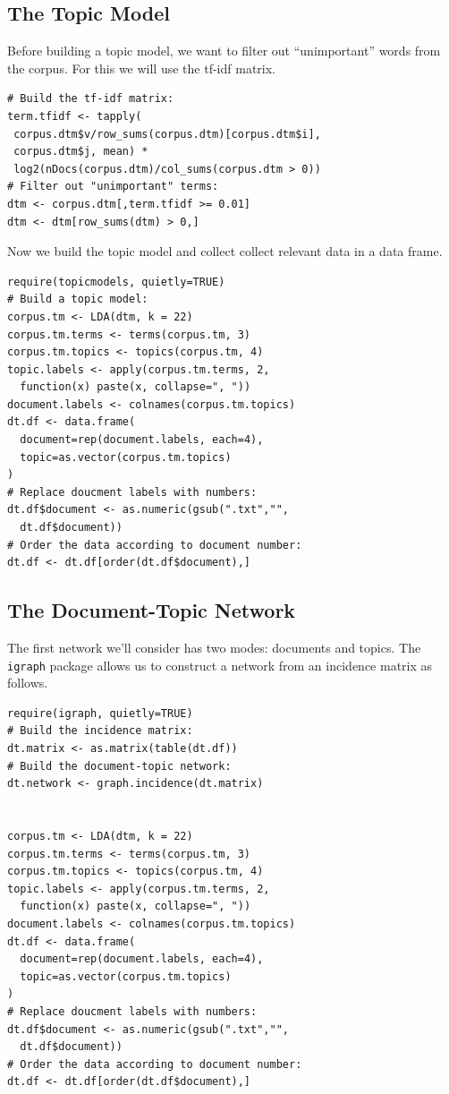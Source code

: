 \documentclass[%
	final,
	notitlepage,
	narroweqnarray,
	inline,
	]{ieee}
\begin{document}
\subsection{The Topic Model}

\PARstart Before building a topic model, we want to filter out ``unimportant'' words from
the corpus. For this we will use the tf-idf matrix.

\begin{verbatim}
# Build the tf-idf matrix:
term.tfidf <- tapply(
 corpus.dtm$v/row_sums(corpus.dtm)[corpus.dtm$i], 
 corpus.dtm$j, mean) * 
 log2(nDocs(corpus.dtm)/col_sums(corpus.dtm > 0))
# Filter out "unimportant" terms:
dtm <- corpus.dtm[,term.tfidf >= 0.01]
dtm <- dtm[row_sums(dtm) > 0,]
\end{verbatim}

Now we build the topic model and collect collect relevant data in a data frame.

\begin{verbatim}
require(topicmodels, quietly=TRUE)
# Build a topic model:
corpus.tm <- LDA(dtm, k = 22)
corpus.tm.terms <- terms(corpus.tm, 3)
corpus.tm.topics <- topics(corpus.tm, 4)
topic.labels <- apply(corpus.tm.terms, 2, 
  function(x) paste(x, collapse=", "))
document.labels <- colnames(corpus.tm.topics)
dt.df <- data.frame(
  document=rep(document.labels, each=4),
  topic=as.vector(corpus.tm.topics)
)
# Replace doucment labels with numbers:
dt.df$document <- as.numeric(gsub(".txt","",
  dt.df$document))
# Order the data according to document number:
dt.df <- dt.df[order(dt.df$document),]
\end{verbatim}


\subsection{The Document-Topic Network}
\PARstart The first network we'll consider has two modes: documents and topics. 
The {\tt igraph} package allows us to construct a network from an incidence 
matrix as follows.

\begin{verbatim}
require(igraph, quietly=TRUE)
# Build the incidence matrix:
dt.matrix <- as.matrix(table(dt.df))
# Build the document-topic network:
dt.network <- graph.incidence(dt.matrix)


corpus.tm <- LDA(dtm, k = 22)
corpus.tm.terms <- terms(corpus.tm, 3)
corpus.tm.topics <- topics(corpus.tm, 4)
topic.labels <- apply(corpus.tm.terms, 2, 
  function(x) paste(x, collapse=", "))
document.labels <- colnames(corpus.tm.topics)
dt.df <- data.frame(
  document=rep(document.labels, each=4),
  topic=as.vector(corpus.tm.topics)
)
# Replace doucment labels with numbers:
dt.df$document <- as.numeric(gsub(".txt","",
  dt.df$document))
# Order the data according to document number:
dt.df <- dt.df[order(dt.df$document),]
\end{verbatim}
\end{document}
